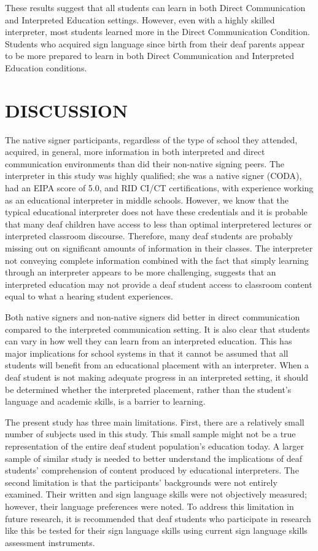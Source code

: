\documentclass[11.5pt]{sig-alternate} %
\begin{document}
\begin{large}
These results suggest that all students can learn in both Direct Communication and Interpreted Education settings. However, even with a highly skilled interpreter, most students learned more in the Direct Communication Condition. Students who acquired sign language since birth from their deaf parents appear to be more prepared to learn in both Direct Communication and Interpreted Education conditions.

\section*{DISCUSSION}

The native signer participants, regardless of the type of school they attended, acquired, in general, more information in both interpreted and direct communication environments than did their non-native signing peers. The interpreter in this study was highly qualified; she was a native signer (CODA), had an EIPA score of 5.0, and RID CI/CT certifications, with experience working as an educational interpreter in middle schools. However, we know that the typical educational interpreter does not have these credentials and it is probable that many deaf children have access to less than optimal interpretered lectures or interpreted classroom discourse. Therefore, many deaf students are probably missing out on significant amounts of information in their classes. The interpreter not conveying complete information combined with the fact that simply learning through an interpreter appears to be more challenging, suggests that an interpreted education may not provide a deaf student access to classroom content equal to what a hearing student experiences. 

Both native signers and non-native signers did better in direct communication compared to the interpreted communication setting. It is also clear that students can vary in how well they can learn from an interpreted education.  This has major implications for school systems in that it cannot be assumed that all students will benefit from an educational placement with an interpreter.  When a deaf student is not making adequate progress in an interpreted setting, it should be determined whether the interpreted placement, rather than the student’s language and academic skills, is a barrier to learning. 

The present study has three main limitations. First, there are a relatively small number of subjects used in this study. This small sample might not be a true representation of the entire deaf student population’s education today. A larger sample of similar study is needed to better understand the implications of deaf students’ comprehension of content produced by educational interpreters. The second limitation is that the participants’ backgrounds were not entirely examined. Their written and sign language skills were not objectively measured; however, their language preferences were noted. To address this limitation in future research, it is recommended that deaf students who participate in research like this be tested for their sign language skills using current sign language skills assessment instruments.


\end{large}
\end{document}
